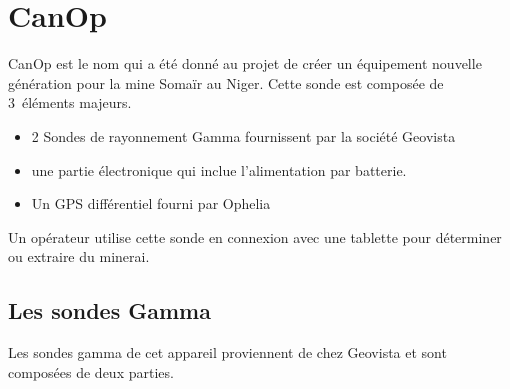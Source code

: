 \section{CanOp}
\label{sec_CanOp}
CanOp est le nom qui a été donné au projet de créer un équipement nouvelle génération pour la mine Somaïr au Niger. Cette sonde est composée de 3~éléments majeurs.
\begin{itemize}
    \item 2 Sondes de rayonnement Gamma fournissent par la société Geovista
    \item une partie électronique qui inclue l'alimentation par batterie. %
    \item Un GPS différentiel fourni par Ophelia
\end{itemize}
Un opérateur utilise cette sonde en connexion avec une tablette pour déterminer ou extraire du minerai.%
\subsection{Les sondes Gamma}
\label{ssec_sonde}



Les sondes gamma de cet appareil proviennent de chez Geovista et sont composées de deux parties.

